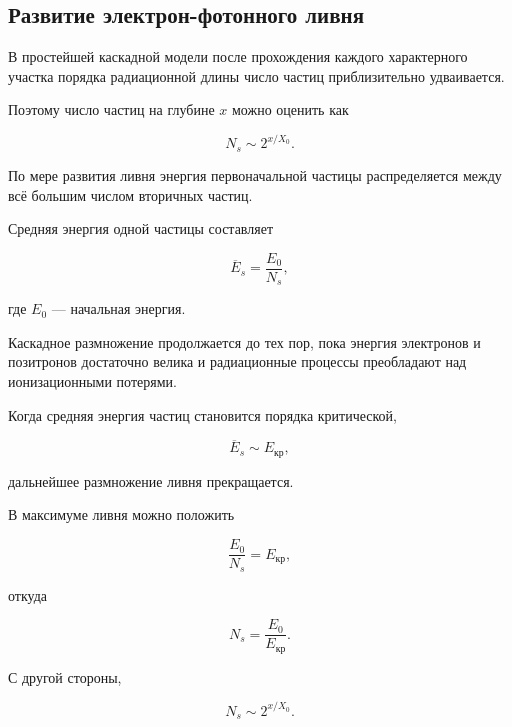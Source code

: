 \documentclass[../final.tex]{subfiles}
\begin{document}
\subsection{Развитие электрон-фотонного ливня}

В простейшей каскадной модели после прохождения каждого характерного
участка порядка радиационной длины число частиц приблизительно
удваивается.

Поэтому число частиц на глубине $x$ можно оценить как

\begin{equation*}
    N_s
    \sim
    2^{x/X_0}.
\end{equation*}

По мере развития ливня энергия первоначальной частицы распределяется
между всё большим числом вторичных частиц.

Средняя энергия одной частицы составляет

\begin{equation*}
    \overline{E}_s
    =
    \frac{E_0}{N_s},
\end{equation*}

где $E_0$ --- начальная энергия.

Каскадное размножение продолжается до тех пор, пока энергия
электронов и позитронов достаточно велика и радиационные процессы
преобладают над ионизационными потерями.

Когда средняя энергия частиц становится порядка критической,

\begin{equation*}
    \overline{E}_s
    \sim
    E_{\text{кр}},
\end{equation*}

дальнейшее размножение ливня прекращается.

В максимуме ливня можно положить

\begin{equation*}
    \frac{E_0}{N_s}
    =
    E_{\text{кр}},
\end{equation*}

откуда

\begin{equation*}
    N_s
    =
    \frac{E_0}{E_{\text{кр}}}.
\end{equation*}

С другой стороны,

\begin{equation*}
    N_s
    \sim
    2^{x/X_0}.
\end{equation*}
\end{document}
